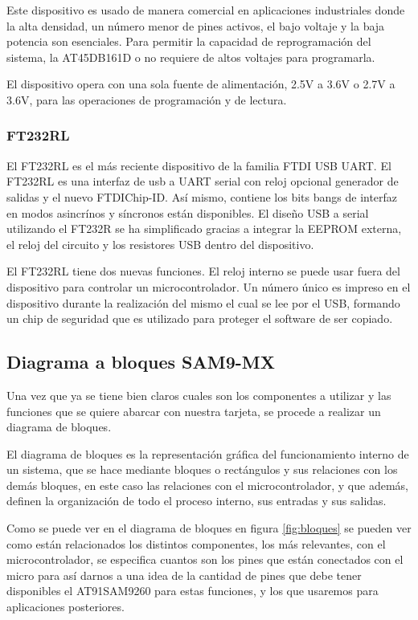 Este dispositivo es usado de manera comercial en aplicaciones industriales
donde la alta densidad, un número menor de pines activos, el bajo
voltaje y la baja potencia son esenciales. Para permitir la capacidad
de reprogramación del sistema, la AT45DB161D o no requiere de altos
voltajes para programarla. 

El dispositivo opera con una sola fuente de alimentaci\'{o}n, 2.5V
a 3.6V o 2.7V a 3.6V, para las operaciones de programación y de lectura. 


\subsubsection*{FT232RL }

El FT232RL es el m\'{a}s reciente dispositivo de la familia FTDI USB
UART. El FT232RL es una interfaz de usb a UART serial con reloj opcional
generador de salidas y el nuevo FTDIChip-ID. As\'{i} mismo, contiene
los bits bangs de interfaz en modos asincr\'{i}nos y síncronos est\'{a}n
disponibles. El diseño USB a serial utilizando el FT232R se ha simplificado 
gracias a integrar la EEPROM externa, el reloj del circuito y los
resistores USB dentro del dispositivo.\citet{ft232}

El FT232RL tiene dos nuevas funciones. El reloj interno se puede usar
fuera del dispositivo para controlar un microcontrolador. Un número
único es impreso en el dispositivo durante la realizaci\'{o}n del
mismo el cual se lee por el USB, formando un chip de seguridad que
es utilizado para proteger el software de ser copiado. 

\newpage{}


\subsection{Diagrama a bloques SAM9-MX}

Una vez que ya se tiene bien claros cuales son los componentes a utilizar
y las funciones que se quiere abarcar con nuestra tarjeta, se procede
a realizar un diagrama de bloques. 

El diagrama de bloques es la representaci\'{o}n gr\'{a}fica del funcionamiento
interno de un sistema, que se hace mediante bloques o rectángulos
y sus relaciones con los demás bloques, en este caso las relaciones
con el microcontrolador, y que además, definen la organización de
todo el proceso interno, sus entradas y sus salidas. 

Como se puede ver en el diagrama de bloques en figura \ref{fig:bloques}
se pueden ver como están relacionados los distintos componentes, los
más relevantes, con el microcontrolador, se especifica cuantos son
los pines que est\'{a}n conectados con el micro para así darnos a
una idea de la cantidad de pines que debe tener disponibles el AT91SAM9260
para estas funciones, y los que usaremos para aplicaciones posteriores. 

